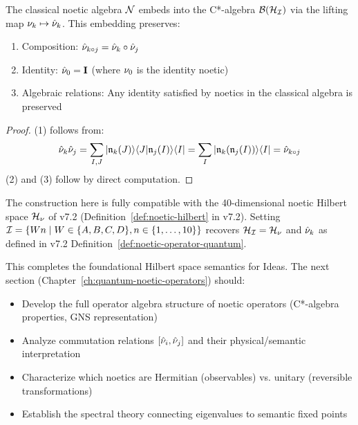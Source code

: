 \begin{corollary}
\label{cor:noetic-algebra-embedding}
The classical noetic algebra $\mathcal{N}$ embeds into the C*-algebra $\mathcal{B}(\mathcal{H}_{\mathcal{I}})$ via the lifting map $\nu_{k} \mapsto \hat{\nu}_k$. This embedding preserves:
\begin{enumerate}
  \item Composition: $\hat{\nu}_{k \circ j} = \hat{\nu}_k \circ \hat{\nu}_j$
  \item Identity: $\hat{\nu}_0 = \mathbf{I}$ (where $\nu_{0}$ is the identity noetic)
  \item Algebraic relations: Any identity satisfied by noetics in the classical algebra is preserved
\end{enumerate}
\end{corollary}

\begin{proof}
(1) follows from:
\[
\hat{\nu}_k \hat{\nu}_j = \sum_{I,J} |\mathfrak{n}_k(J)\rangle\langle J | \mathfrak{n}_j(I) \rangle\langle I| = \sum_I |\mathfrak{n}_k(\mathfrak{n}_j(I))\rangle\langle I| = \hat{\nu}_{k \circ j}
\]
(2) and (3) follow by direct computation.
\end{proof}

\begin{remark}
\label{rem:v72-compat}
The construction here is fully compatible with the 40-dimensional noetic Hilbert space $\mathcal{H}_\nu$ of v7.2 (Definition~\ref{def:noetic-hilbert} in v7.2). Setting $\mathcal{I} = \{Wn \mid W \in \{A,B,C,D\}, n \in \{1,\ldots,10\}\}$ recovers $\mathcal{H}_{\mathcal{I}} = \mathcal{H}_\nu$ and $\hat{\nu}_k$ as defined in v7.2 Definition~\ref{def:noetic-operator-quantum}.
\end{remark}

\begin{tcolorbox}[colback=green!5!white,colframe=green!50!black,title=\textbf{Handoff: Next Steps},breakable]
This completes the foundational Hilbert space semantics for Ideas. The next section (Chapter~\ref{ch:quantum-noetic-operators}) should:
\begin{itemize}
  \item Develop the full operator algebra structure of noetic operators (C*-algebra properties, GNS representation)
  \item Analyze commutation relations $[\hat{\nu}_i, \hat{\nu}_j]$ and their physical/semantic interpretation
  \item Characterize which noetics are Hermitian (observables) vs. unitary (reversible transformations)
  \item Establish the spectral theory connecting eigenvalues to semantic fixed points
\end{itemize}
\end{tcolorbox}


